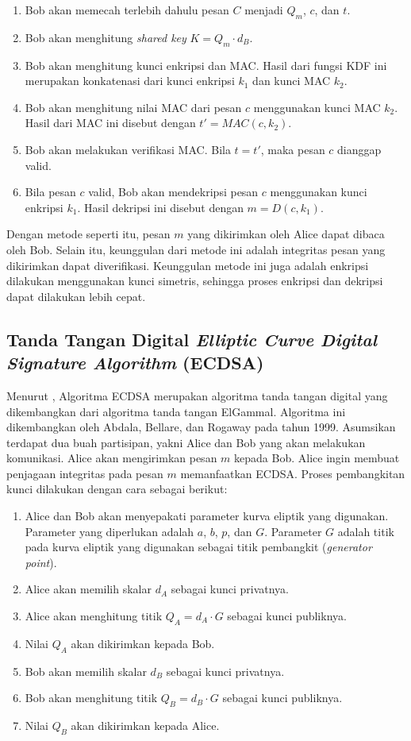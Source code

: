 \documentclass[conference]{IEEEtran}
\begin{document}
\begin{enumerate}
    \item Bob akan memecah terlebih dahulu pesan $C$ menjadi $Q_m$, $c$, dan $t$.
    \item Bob akan menghitung \emph{shared key} $K = Q_m \cdot d_B$.
    \item Bob akan menghitung kunci enkripsi dan MAC. Hasil dari fungsi KDF ini merupakan konkatenasi dari kunci enkripsi $k_1$ dan kunci MAC $k_2$.
    \item Bob akan menghitung nilai MAC dari pesan $c$ menggunakan kunci MAC $k_2$. Hasil dari MAC ini disebut dengan $t' = MAC(c, k_2)$.
    \item Bob akan melakukan verifikasi MAC. Bila $t = t'$, maka pesan $c$ dianggap valid.
    \item Bila pesan $c$ valid, Bob akan mendekripsi pesan $c$ menggunakan kunci enkripsi $k_1$. Hasil dekripsi ini disebut dengan $m = D(c, k_1)$.
\end{enumerate}

Dengan metode seperti itu, pesan $m$ yang dikirimkan oleh Alice dapat dibaca oleh Bob. Selain itu, keunggulan dari metode ini adalah integritas pesan yang dikirimkan dapat diverifikasi. Keunggulan metode ini juga adalah enkripsi dilakukan menggunakan kunci simetris, sehingga proses enkripsi dan dekripsi dapat dilakukan lebih cepat.

\subsection{Tanda Tangan Digital \emph{Elliptic Curve Digital Signature Algorithm} (ECDSA)}

Menurut \cite{munir2019}, Algoritma ECDSA merupakan algoritma tanda tangan digital yang dikembangkan dari algoritma tanda tangan ElGammal. Algoritma ini dikembangkan oleh Abdala, Bellare, dan Rogaway pada tahun 1999. Asumsikan terdapat dua buah partisipan, yakni Alice dan Bob yang akan melakukan komunikasi. Alice akan mengirimkan pesan $m$ kepada Bob. Alice ingin membuat penjagaan integritas pada pesan $m$ memanfaatkan ECDSA. Proses pembangkitan kunci dilakukan dengan cara sebagai berikut\cite{ali2016}:

\begin{enumerate}
    \item Alice dan Bob akan menyepakati parameter kurva eliptik yang digunakan. Parameter yang diperlukan adalah $a$, $b$, $p$, dan $G$. Parameter $G$ adalah titik pada kurva eliptik yang digunakan sebagai titik pembangkit (\emph{generator point}).
    \item Alice akan memilih skalar $d_A$ sebagai kunci privatnya.
    \item Alice akan menghitung titik $Q_A = d_A \cdot G$ sebagai kunci publiknya.
    \item Nilai $Q_A$ akan dikirimkan kepada Bob.
    \item Bob akan memilih skalar $d_B$ sebagai kunci privatnya.
    \item Bob akan menghitung titik $Q_B = d_B \cdot G$ sebagai kunci publiknya.
    \item Nilai $Q_B$ akan dikirimkan kepada Alice.
\end{enumerate}
\end{document}
